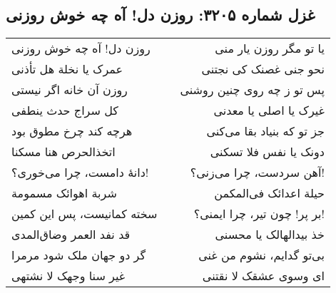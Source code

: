 \begin{center}
\section*{غزل شماره ۳۲۰۵: روزن دل! آه چه خوش روزنی}
\label{sec:3205}
\begin{longtable}{l p{0.5cm} r}
روزن دل! آه چه خوش روزنی
&&
یا تو مگر روزن یار منی
\\
عمرک یا نخلة هل تأذنی
&&
نحو جنی غصنک کی نجتنی
\\
روزن آن خانه اگر نیستی
&&
پس تو ز چه روی چنین روشنی
\\
کل سراج حدث ینطفی
&&
غیرک یا اصلی یا معدنی
\\
هرچه کند چرخ مطوق بود
&&
جز تو که بنیاد بقا می‌کنی
\\
اتخذالحرص هنا مسکنا
&&
دونک یا نفس فلا تسکنی
\\
دانهٔ دامست، چرا می‌خوری؟!
&&
آهن سردست، چرا می‌زنی؟!
\\
شربة اهوائک مسمومة
&&
حیلة اعدائک فی‌المکمن
\\
سخته کمانیست، پس این کمین
&&
بر پر! چون تیر، چرا ایمنی؟!
\\
قد نفد العمر وضاق‌المدی
&&
خذ بیدالهالک یا محسنی
\\
گر دو جهان ملک شود مرمرا
&&
بی‌تو گدایم، نشوم من غنی
\\
غیر سنا وجهک لا نشتهی
&&
ای وسوی عشقک لا نقتنی
\\
\end{longtable}
\end{center}
